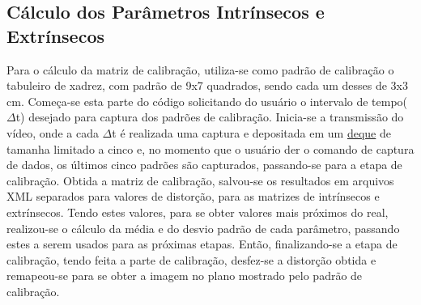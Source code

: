 \documentclass{bmvc2k}
\begin{document}
\subsection{Cálculo dos Parâmetros Intrínsecos e Extrínsecos}
Para o cálculo da matriz de calibração, utiliza-se como padrão de calibração o tabuleiro de xadrez, com padrão de 9x7 quadrados, sendo cada um desses de 3x3 cm. Começa-se esta parte do código solicitando do usuário o intervalo de tempo($\Delta$t) desejado para  captura dos padrões de calibração. Inicia-se a transmissão do vídeo, onde a cada $\Delta$t é realizada uma captura e depositada em um \href{https://docs.python.org/2/library/collections.html#deque-objects}{deque} de tamanha limitado a cinco e, no momento que o usuário der o comando de captura de dados, os últimos cinco padrões são capturados, passando-se para a etapa de calibração. Obtida a matriz de calibração, salvou-se os resultados em arquivos XML separados para valores de distorção, para as matrizes de intrínsecos e extrínsecos. Tendo estes valores, para se obter valores mais próximos do real, realizou-se o cálculo da média e do desvio padrão de cada parâmetro, passando estes a serem usados para as próximas etapas. Então, finalizando-se a etapa de calibração, tendo feita a parte de calibração, desfez-se a distorção obtida e remapeou-se para se obter a imagem no plano mostrado pelo padrão de calibração.\\
\end{document}
